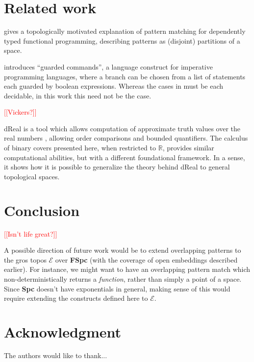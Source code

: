\documentclass[conference]{IEEEtran}
\newcommand{\R}{\mathbb{R}}
\newcommand{\note}[1]{\textcolor{red}{[[{#1}]]}}
\begin{document}
\section{Related work}

\cite{coquand1992} gives a topologically motivated explanation of pattern matching for dependently typed functional programming, describing patterns as (disjoint) partitions of a space.

\cite{dijkstra} introduces ``guarded commands'', a language construct for imperative programming languages, where a branch can be chosen from a list of statements each guarded by boolean expressions. Whereas the cases in \cite{dijkstra} must be each decidable, in this work this need not be the case.

\note{Vickers?}

dReal is a tool which allows computation of approximate truth values over the real numbers \cite{dReal}, allowing order comparisons and bounded quantifiers. The calculus of binary covers presented here, when restricted to $\R$, provides similar computational abilities, but with a different foundational framework. In a sense, it shows how it is possible to generalize the theory behind dReal to general topological spaces.

\section{Conclusion}
\note{Isn't life great?}

A possible direction of future work would be to extend overlapping patterns to the gros topos $\mathcal{E}$ over \textbf{FSpc} (with the coverage of open embeddings described earlier). For instance, we might want to have an overlapping pattern match which non-deterministically returns a \emph{function}, rather than simply a point of a space. Since \textbf{Spc} doesn't have exponentials in general, making sense of this would require extending the constructs defined here to $\mathcal{E}$.




\section*{Acknowledgment}


The authors would like to thank...
\end{document}
